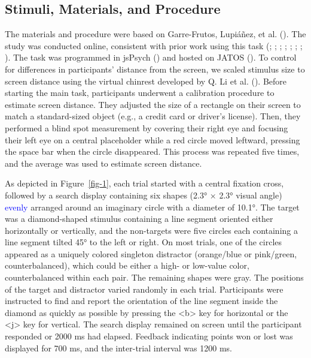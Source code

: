 \documentclass[
  man,
  floatsintext,
  longtable,
  nolmodern,
  notxfonts,
  notimes,
  mask,
  colorlinks=true,linkcolor=blue,citecolor=blue,urlcolor=blue]{apa7}
\begin{document}
\subsection{Stimuli, Materials, and
Procedure}\label{stimuli-materials-and-procedure}

The materials and procedure were based on Garre-Frutos, Lupiáñez, et al.
(). The study was conducted
online, consistent with prior work using this task
(;
;
;
;
;
;
;
). The task was programmed
in jsPsych () and hosted on
JATOS (). To control for
differences in participants' distance from the screen, we scaled
stimulus size to screen distance using the virtual chinrest developed by
Q. Li et al. (). Before starting the main
task, participants underwent a calibration procedure to estimate screen
distance. They adjusted the size of a rectangle on their screen to match
a standard-sized object (e.g., a credit card or driver's license). Then,
they performed a blind spot measurement by covering their right eye and
focusing their left eye on a central placeholder while a red circle
moved leftward, pressing the space bar when the circle disappeared. This
process was repeated five times, and the average was used to estimate
screen distance.

As depicted in Figure~\ref{fig-1}, each trial started with a central
fixation cross, followed by a search display containing six shapes (2.3°
× 2.3° visual angle) \textcolor{blue}{evenly} arranged around an
imaginary circle with a diameter of 10.1°. The target was a
diamond-shaped stimulus containing a line segment oriented either
horizontally or vertically, and the non-targets were five circles each
containing a line segment tilted 45° to the left or right. On most
trials, one of the circles appeared as a uniquely colored singleton
distractor (orange/blue or pink/green, counterbalanced), which could be
either a high- or low-value color, counterbalanced within each pair. The
remaining shapes were gray. The positions of the target and distractor
varied randomly in each trial. Participants were instructed to find and
report the orientation of the line segment inside the diamond as quickly
as possible by pressing the \textless b\textgreater{} key for horizontal
or the \textless j\textgreater{} key for vertical. The search display
remained on screen until the participant responded or 2000 ms had
elapsed. Feedback indicating points won or lost was displayed for 700
ms, and the inter-trial interval was 1200 ms.
\end{document}
